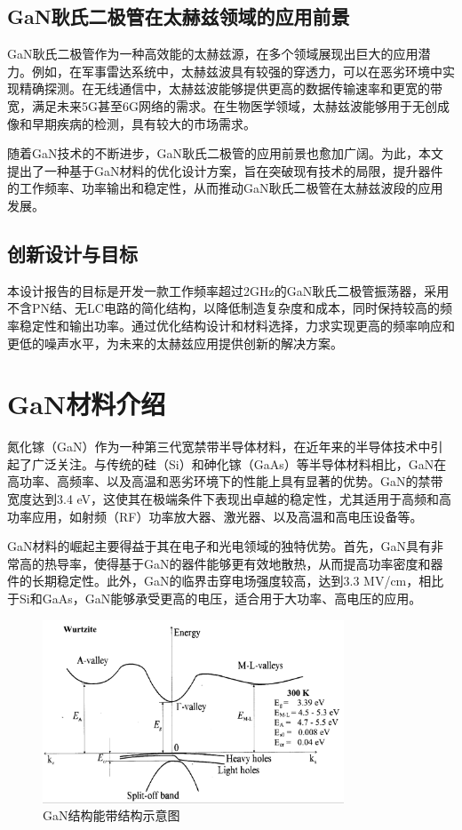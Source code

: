 \documentclass[12pt,hyperref,a4paper,UTF8]{ctexart}
\begin{document}
\subsection*{GaN耿氏二极管在太赫兹领域的应用前景}

GaN耿氏二极管作为一种高效能的太赫兹源，在多个领域展现出巨大的应用潜力。例如，在军事雷达系统中，太赫兹波具有较强的穿透力，可以在恶劣环境中实现精确探测。在无线通信中，太赫兹波能够提供更高的数据传输速率和更宽的带宽，满足未来5G甚至6G网络的需求。在生物医学领域，太赫兹波能够用于无创成像和早期疾病的检测，具有较大的市场需求。

随着GaN技术的不断进步，GaN耿氏二极管的应用前景也愈加广阔。为此，本文提出了一种基于GaN材料的优化设计方案，旨在突破现有技术的局限，提升器件的工作频率、功率输出和稳定性，从而推动GaN耿氏二极管在太赫兹波段的应用发展。

\subsection*{创新设计与目标}

本设计报告的目标是开发一款工作频率超过2GHz的GaN耿氏二极管振荡器，采用不含PN结、无LC电路的简化结构，以降低制造复杂度和成本，同时保持较高的频率稳定性和输出功率。通过优化结构设计和材料选择，力求实现更高的频率响应和更低的噪声水平，为未来的太赫兹应用提供创新的解决方案。

\section{GaN材料介绍}

氮化镓（GaN）作为一种第三代宽禁带半导体材料，在近年来的半导体技术中引起了广泛关注。与传统的硅（Si）和砷化镓（GaAs）等半导体材料相比，GaN在高功率、高频率、以及高温和恶劣环境下的性能上具有显著的优势。GaN的禁带宽度达到3.4 eV，这使其在极端条件下表现出卓越的稳定性，尤其适用于高频和高功率应用，如射频（RF）功率放大器、激光器、以及高温和高电压设备等。

GaN材料的崛起主要得益于其在电子和光电领域的独特优势。首先，GaN具有非常高的热导率，使得基于GaN的器件能够更有效地散热，从而提高功率密度和器件的长期稳定性。此外，GaN的临界击穿电场强度较高，达到3.3 MV/cm，相比于Si和GaAs，GaN能够承受更高的电压，适合用于大功率、高电压的应用。


\begin{figure}[H]
\centering
\includegraphics[width=0.8\textwidth]{figures/fig/image2.png}
\caption{GaN结构能带结构示意图\cite{suzuki1995first}}
\label{fig:GaN_ band}
\end{figure}
\end{document}
